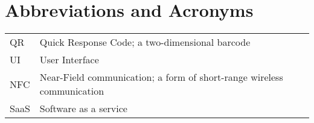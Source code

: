 \documentclass[thesis.tex]{subfiles}
\begin{document}
\chapter*{Abbreviations and Acronyms}

\noindent
\begin{longtable}{@{}p{}p{}@{}}
QR & Quick Response Code; a two-dimensional barcode \\
UI & User Interface \\
NFC & Near-Field communication; a form of short-range wireless communication \\
SaaS & Software as a service

\end{longtable}
\end{document}
